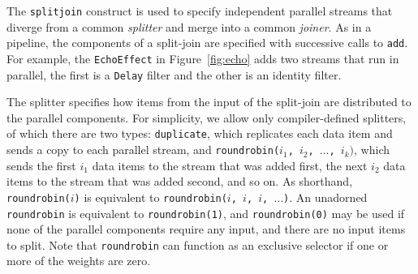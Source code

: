 

The  \texttt{splitjoin}  construct  is  used  to  specify  independent
parallel streams that diverge  from a common \emph{splitter} and merge
into a  common \emph{joiner}.  As in  a pipeline, the  components of a
split-join are  specified with successive calls  to \texttt{add}.  For
example,  the \texttt{EchoEffect}  in  Figure~\ref{fig:echo} adds  two
streams that run in parallel, the first is a \texttt{Delay} filter and
the other is an identity filter.

The splitter specifies how items  from the input of the split-join are
distributed to the parallel components.  For simplicity, we allow only
compiler-defined splitters, of which there are two types:
\texttt{duplicate}, which replicates each data item and sends a copy
to each parallel stream, and \texttt{roundrobin($i_1$, $i_2$, $\dots$,
$i_k)$}, which sends the first $i_1$ data items to the stream that was
added first,  the next $i_2$ data  items to the stream  that was added
second,  and   so  on.   As   shorthand,  \texttt{roundrobin($i$)}  is
equivalent  to   \texttt{roundrobin($i$,  $i$,  $i$,   $\dots$)}.   An
unadorned \texttt{roundrobin} is equivalent to \texttt{roundrobin(1)},
and  \texttt{roundrobin(0)}  may  be  used  if none  of  the  parallel
components require any  input, and there are no  input items to split.
Note that \texttt{roundrobin} can function as an exclusive selector if
one or more of the weights are zero.

